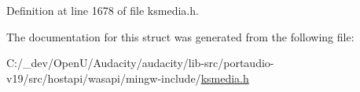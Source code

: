Definition at line 1678 of file ksmedia.\+h.



The documentation for this struct was generated from the following file\+:\begin{DoxyCompactItemize}
\item 
C\+:/\+\_\+dev/\+Open\+U/\+Audacity/audacity/lib-\/src/portaudio-\/v19/src/hostapi/wasapi/mingw-\/include/\hyperlink{ksmedia_8h}{ksmedia.\+h}\end{DoxyCompactItemize}
